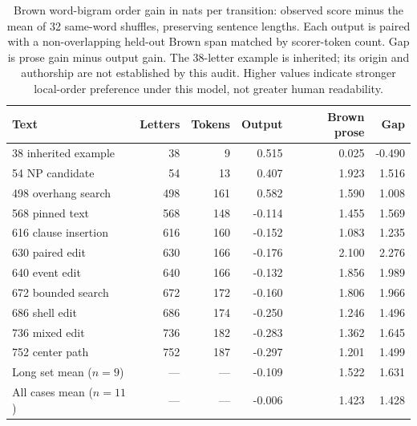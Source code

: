 \begin{table}[t]
\centering\scriptsize
\setlength{\tabcolsep}{2pt}
\begin{tabular}{@{}lrrrrr@{}}
\toprule
Text & Letters & Tokens & Output & Brown prose & Gap \\
\midrule
38 inherited example & 38 & 9 & 0.515 & 0.025 & -0.490 \\
54 NP candidate & 54 & 13 & 0.407 & 1.923 & 1.516 \\
498 overhang search & 498 & 161 & 0.582 & 1.590 & 1.008 \\
568 pinned text & 568 & 148 & -0.114 & 1.455 & 1.569 \\
616 clause insertion & 616 & 160 & -0.152 & 1.083 & 1.235 \\
630 paired edit & 630 & 166 & -0.176 & 2.100 & 2.276 \\
640 event edit & 640 & 166 & -0.132 & 1.856 & 1.989 \\
672 bounded search & 672 & 172 & -0.160 & 1.806 & 1.966 \\
686 shell edit & 686 & 174 & -0.250 & 1.246 & 1.496 \\
736 mixed edit & 736 & 182 & -0.283 & 1.362 & 1.645 \\
752 center path & 752 & 187 & -0.297 & 1.201 & 1.499 \\
Long set mean ($n=9$) & --- & --- & -0.109 & 1.522 & 1.631 \\
All cases mean ($n=11$) & --- & --- & -0.006 & 1.423 & 1.428 \\
\bottomrule
\end{tabular}
\caption{Brown word-bigram order gain in nats per transition: observed score minus the mean of 32 same-word shuffles, preserving sentence lengths. Each output is paired with a non-overlapping held-out Brown span matched by scorer-token count. Gap is prose gain minus output gain. The 38-letter example is inherited; its origin and authorship are not established by this audit. Higher values indicate stronger local-order preference under this model, not greater human readability.}
\label{tab:order-gain}
\end{table}

